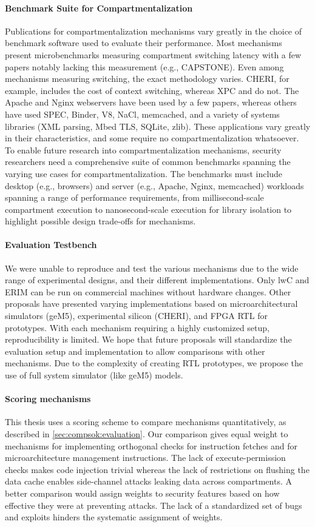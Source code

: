 \paragraph{Benchmark Suite for Compartmentalization}
Publications for compartmentalization mechanisms vary greatly in the
choice of benchmark software used to evaluate their performance.
Most mechanisms present microbenchmarks measuring compartment switching 
latency with a few papers notably lacking this measurement (e.g., CAPSTONE).
Even among mechanisms measuring switching, the exact methodology varies.
CHERI, for example, includes the cost of context switching, whereas XPC and
\seccells do not.
The Apache and Nginx webservers have been used by a few 
papers, whereas others have used SPEC, Binder, V8, NaCl, memcached, and a 
variety of systems libraries (XML parsing, Mbed TLS, SQLite, zlib).
These applications vary greatly in their characteristics, and some require
no compartmentalization whatsoever.
To enable future research into compartmentalization mechanisms, 
security researchers need a comprehensive suite of common benchmarks
spanning the varying use cases for compartmentalization.
The benchmarks must include desktop (e.g., browsers) and 
server (e.g., Apache, Nginx, memcached) workloads spanning a range of
performance requirements, from millisecond-scale compartment execution to
nanosecond-scale execution for library isolation to highlight possible 
design trade-offs for mechanisms.

\paragraph{Evaluation Testbench}
We were unable to reproduce and test the various mechanisms due to the
wide range of experimental designs, and their different implementations.
Only lwC and ERIM can be run on commercial machines without hardware changes.
Other proposals have presented varying implementations based on
microarchitectural simulators (geM5), experimental silicon (CHERI), and
FPGA RTL for prototypes.
With each mechanism requiring a highly customized setup, reproducibility is
limited.
We hope that future proposals will standardize the evaluation setup and 
implementation to allow comparisons with other mechanisms.
Due to the complexity of creating RTL prototypes, we propose the use of 
full system simulator (like geM5) models.

\paragraph{Scoring mechanisms}
This thesis uses a scoring scheme to compare mechanisms quantitatively, as
described in \autoref{sec:compsok:evaluation}. 
Our comparison gives equal weight to mechanisms for implementing
orthogonal checks for instruction fetches and for microarchitecture 
management instructions.
The lack of execute-permission checks makes code injection trivial whereas the
lack of restrictions on flushing the data cache enables side-channel attacks
leaking data across compartments. 
A better comparison would assign weights to security features based on how
effective they were at preventing attacks.
The lack of a standardized set of bugs and exploits hinders the systematic
assignment of weights.

